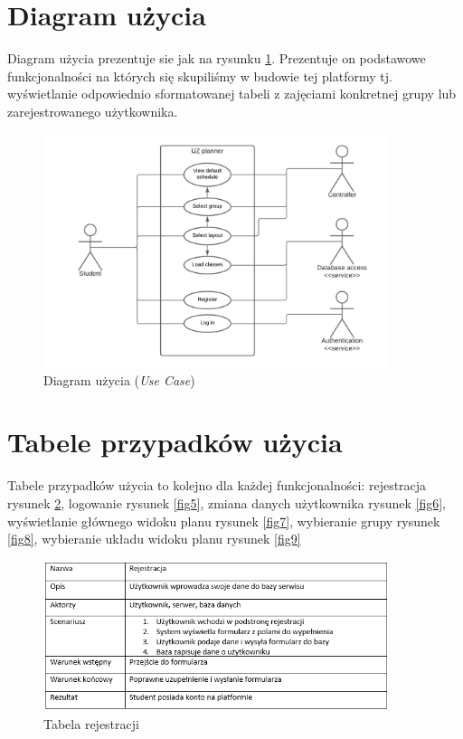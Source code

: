 \documentclass[a4paper,11pt]{uzreport}
\begin{document}
\section{Diagram użycia}

    Diagram użycia prezentuje sie jak na rysunku \ref{diagram_uzyca}. Prezentuje on podstawowe funkcjonalności na których się skupiliśmy w budowie tej platformy tj. wyświetlanie odpowiednio sformatowanej tabeli z zajęciami konkretnej grupy lub zarejestrowanego użytkownika.

    \begin{figure}[ht!]
        \centering
        \includegraphics[width=0.9\textwidth]{pictures/use_case.png}
        \caption{Diagram użycia (\textit{Use Case})}
        \label{diagram_uzyca}
     \end{figure}

\section{Tabele przypadków użycia}

    Tabele przypadków użycia to kolejno dla każdej funkcjonalności: rejestracja rysunek \ref{fig4}, logowanie rysunek \ref{fig5}, zmiana danych użytkownika rysunek \ref{fig6}, wyświetlanie głównego widoku planu rysunek \ref{fig7}, wybieranie grupy rysunek \ref{fig8}, wybieranie układu widoku planu rysunek \ref{fig9} \\

    \begin{figure}[ht!]
        \centering
        \includegraphics[width=0.9\textwidth]{pictures/rejestracja.PNG}
        \caption{Tabela rejestracji}
        \label{fig4}
     \end{figure}
\end{document}
